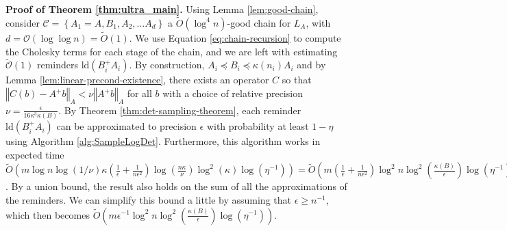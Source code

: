 \textbf{Proof of Theorem \ref{thm:ultra_main}.} Using Lemma \ref{lem:good-chain},
consider $\mathcal{C}=\left\{ A_{1}=A,B_{1},A_{2},\dots A_{d}\right\} $
a $\tilde{O}\left(\log^{4}n\right)$-good chain for $L_{A}$, with
$d=\mathcal{O}\left(\log\log n\right)=\tilde{O}\left(1\right)$. We
use Equation \ref{eq:chain-recursion} to compute the Cholesky terms
for each stage of the chain, and we are left with estimating $\tilde{\mathcal{O}}\left(1\right)$
reminders $\text{ld}\left(B_{i}^{+}A_{i}\right)$. By construction,
$A_{i}\preceq B_{i}\preceq\kappa\left(n_{i}\right)A_{i}$ and by Lemma
\ref{lem:linear-precond-existence}, there exists an operator $C$
so that $\left\Vert C\left(b\right)-A^{+}b\right\Vert _{A}<\nu\left\Vert A^{+}b\right\Vert _{A}$
for all $b$ with a choice of relative precision $\nu=\frac{\epsilon}{16\kappa^{3}\kappa\left(B\right)}$.
By Theorem \ref{thm:det-sampling-theorem}, each reminder $\text{ld}\left(B_{i}^{+}A_{i}\right)$
can be approximated to precision $\epsilon$ with probability at least
$1-\eta$ using Algorithm \ref{alg:SampleLogDet}.
Furthermore, this algorithm works in expected time $\tilde{O}\left(m\log n\log\left(1/\nu\right)\kappa\left(\frac{1}{\epsilon}+\frac{1}{n\epsilon^{2}}\right)\log\left(\frac{n\kappa}{\nu}\right)\log^{2}\left(\kappa\right)\log\left(\eta^{-1}\right)\right)=\tilde{O}\left(m\left(\frac{1}{\epsilon}+\frac{1}{n\epsilon^{2}}\right)\log^{2}n\log^{2}\left(\frac{\kappa\left(B\right)}{\epsilon}\right)\log\left(\eta^{-1}\right)\right)$.
By a union bound, the result also holds on the sum of all the approximations
of the reminders. We can simplify this bound a little by assuming
that $\epsilon\geq n^{-1}$, which then becomes $\tilde{O}\left(m\epsilon^{-1}\log^{2}n\log^{2}\left(\frac{\kappa\left(B\right)}{\epsilon}\right)\log\left(\eta^{-1}\right)\right)$. 

